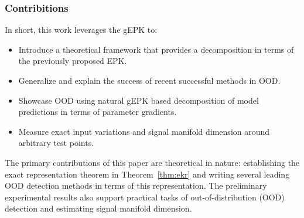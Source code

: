\begin{frame}
  \frametitle{Contribitions}
  In short, this work leverages the gEPK to:
\begin{itemize}
    \item Introduce a theoretical framework that provides a decomposition in terms of the previously proposed EPK. %
    \item Generalize and explain the success of recent successful methods in OOD.
    \item Showcase OOD using natural gEPK based decomposition of model predictions in terms of parameter gradients.
    \item Measure exact input variations and signal manifold dimension
      around arbitrary test points.


\end{itemize}
The primary contributions of this paper are theoretical in nature:
establishing the exact representation theorem in Theorem~\ref{thm:ekr} and writing several leading OOD detection methods in terms of this representation. The preliminary experimental results also support practical tasks of out-of-distribution (OOD) detection and estimating signal manifold dimension. 
      \end{frame}
\label{sec:input}





